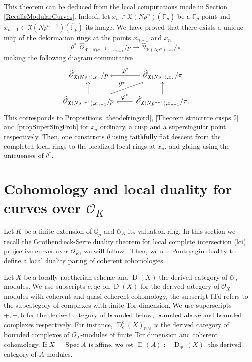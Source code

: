\documentclass[11pt]{article}
\let\ts\textstyle
\newcommand{\rb}{\mathrm{b}}
\newcommand{\rc}{\mathrm{c}}
\newcommand{\qc}{\mathrm{qc}}
\newcommand{\fTd}{\mathrm{fTd}}
\numberwithin{equation}{section}
\theoremstyle{definition}
\newcommand{\bb}[1]{\mathbb{#1}}
\newcommand{\n}[1]{\mathcal{#1}}
\newcommand{\f}[1]{\mathfrak{#1}}
\newcommand{\s}[1]{\mathscr{#1}}
\DeclareMathOperator{\D}{D}
\DeclareMathOperator{\Spec}{Spec}
\begin{document}
This theorem can be deduced from the local computations made in Section \ref{RecallsModularCurves}. Indeed, let $x_{n}\in \f{X}(Np^n)(\overline{\bb{F}}_p)$ be a $\overline{\bb{F}}_p$-point and $x_{n-1}\in \f{X}(Np^{n-1})(\overline{\bb{F}}_p)$ its image. We~have proved that there exists a unique map of the deformation rings at the points $x_{n-1}$ and $x_{n}$
\[
\theta^*: \widehat{\s{O}}_{\f{X}(Np^{n-1}), x_{n-1}} / p \to \widehat{\s{O}}_{\f{X}(Np^{n}), x_{n}} / \pi
\]
making the following diagram commutative
\[
\begin{tikzcd}
\widehat{\s{O}}_{\f{X}(Np^{n}), x_{n}} / p & \widehat{\s{O}}_{\f{X}(Np^{n}), x_{n}} / \pi \ar[l, "\ts\varphi^*"'] \\
\widehat{\s{O}}_{\f{X}(Np^{n-1}), x_{n-1}} / p \ar[u] \ar[ru, "\ts\theta^*"]& \widehat{\s{O}}_{\f{X}(Np^{n-1}), x_{n-1}} / \pi \ar[l , "\ts\varphi^*"'] \ar[u].
\end{tikzcd}
\]
This corresponds to Propositions \ref{theodefringord}, \ref{Theorem structure cusps 2} and \ref{propSuperSingFrob} for $x_{n}$ ordinary, a cusp and a supersingular point respectively. Then, one constructs $\theta$ using faithfully flat descent from the completed local rings to the localized local rings at $x_{n}$, and gluing using the uniqueness of $\theta^*$.

\section{Cohomology and local duality for curves over \texorpdfstring{$\n{O}_K$}{OK}}

\label{Reminders Duality}

Let $K$ be a finite extension of $\bb{Q}_p$ and $\n{O}_K$ its valuation ring. In this section we recall the Grothendieck-Serre duality theorem for local complete intersection (lci) projective curves over $\n{O}_K$, we will follow \cite{hartshorne1966residues}. Then, we use Pontryagin duality to define a local duality paring of coherent cohomologies.

Let $X$ be a locally noetherian scheme and $\D(X)$ the derived category of $\s{O}_X$\nobreakdash-mod\-ules. We use subscripts $\rc, \qc$ on $\D(X)$ for the derived category of $\s{O}_{X}$\nobreakdash-modules with coherent and quasi-coherent cohomology, the subscript $\fTd$ refers to the subcategory of complexes with finite Tor dimension. We use superscripts $+,-,\rb$ for the derived category of bounded below, bounded above and bounded complexes respectively. For instance, $\D_{\rc}^b(X)_{\fTd}$ is the derived category of bounded complexes of $\s{O}_{X}$-modules of finite Tor dimension and coherent cohomology. If $X=\Spec A$ is affine, we set $\D(A):=\D_{\qc}(X)$, the derived category of $A$-modules.
\end{document}
